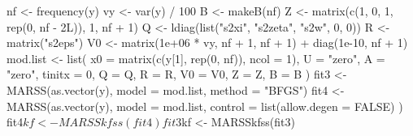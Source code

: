 \begin{Schunk}
\begin{Sinput}
 nf <- frequency(y)
 vy <- var(y) / 100
 B <- makeB(nf)
 Z <- matrix(c(1, 0, 1, rep(0, nf - 2L)), 1, nf + 1)
 Q <- ldiag(list("s2xi", "s2zeta", "s2w", 0, 0))
 R <- matrix("s2eps")
 V0 <- matrix(1e+06 * vy, nf + 1, nf + 1) + diag(1e-10, nf + 1)
 mod.list <- list(
   x0 = matrix(c(y[1], rep(0, nf)), ncol = 1),
   U = "zero", A = "zero", tinitx = 0,
   Q = Q, R = R, V0 = V0, Z = Z, B = B
 )
 fit3 <- MARSS(as.vector(y), model = mod.list, method = "BFGS")
 fit4 <- MARSS(as.vector(y),
   model = mod.list,
   control = list(allow.degen = FALSE)
 )
 fit4$kf <- MARSSkfss(fit4)
 fit3$kf <- MARSSkfss(fit3)
\end{Sinput}
\end{Schunk}
